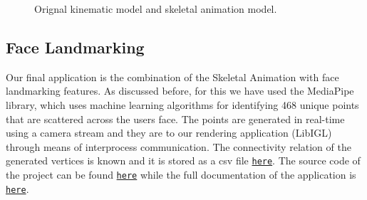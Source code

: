 \begin{figure}[t]
    \centering
    \qquad
    \caption{Orignal kinematic model and skeletal animation model.}
    \label{fig:model_comparison_skeletal_animation}
\end{figure}

\subsection{Face Landmarking}
Our final application is the combination of the Skeletal Animation with 
face landmarking features. As discussed before, for this we have used 
the MediaPipe library, which uses machine learning algorithms for 
identifying 468 unique points that are scattered across the users face.
The points are generated in real-time using a camera stream and they are 
to our rendering application (LibIGL) through means of interprocess
communication. The connectivity relation of the generated vertices is known 
and it is stored as a csv file
\texttt{\href{https://github.com/amartsop/SkeletalAnimationMultiThreadFace/blob/master/share/vertices_connections.csv}{here}}.
The source code of the project can be found 
\texttt{\href{https://github.com/amartsop/SkeletalAnimationMultiThreadFace}{here}}
while the full documentation of the application is
\texttt{\href{https://amartsop.github.io/SkeletalAnimationMultiThreadFace/index.html}{here}}.